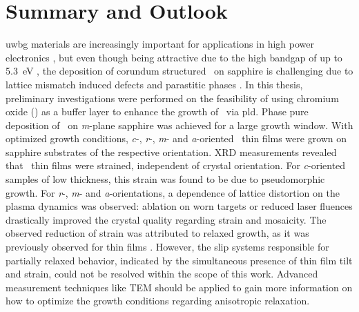 \chapter{Summary and Outlook}
\Acrlong{uwbg} materials are increasingly important for applications in high power electronics
    \cite{yang2017,moser2017,gupta2024},
but even though being attractive due to the high bandgap of up to \qty{5.3}{\eV}
    \cite{hassa2021a},
the deposition of corundum structured \agao\ on sapphire is challeng\-ing due to lattice mismatch induced defects
    \cite{kaneko2012}
and parastitic phases
    \cite{bosi2020}.
In this thesis, preliminary investigations were performed on the feasibility of using chromium oxide (\cro) as a buffer layer to enhance the growth of \agao\ via \acrfull{pld}.
Phase pure deposition of \cro\ on \textit{m}-plane sapphire was achieved for a large growth window.
With optimized growth conditions, \textit{c}-, \textit{r}-, \textit{m}- and \textit{a}-oriented \cro\ thin films were grown on sapphire substrates of the respective orientation.
\acrfull{XRD} measurements revealed that \cro\ thin films were strained, independent of crystal orientation.
For \textit{c}-oriented samples of low thickness, this strain was found to be due to pseudomorphic growth.
For \textit{r}-, \textit{m}- and \textit{a}-orientations, a dependence of lattice distortion on the plasma dynamics was observed: ablation on worn targets or reduced laser fluences drastically improved the crystal quality regarding strain and mosaicity.
The observed reduction of strain was attributed to relaxed growth, as it was previously observed for  thin films
    \cite{kneiss2021,grundmann2020b}.
However, the slip systems responsible for partially relaxed behavior, indicated by the simultaneous presence of thin film tilt and strain, could not be resolved within the scope of this work.
Advanced measurement techniques like \acrshort{TEM} should be applied to gain more information on how to optimize the growth conditions regarding anisotropic relaxation.

